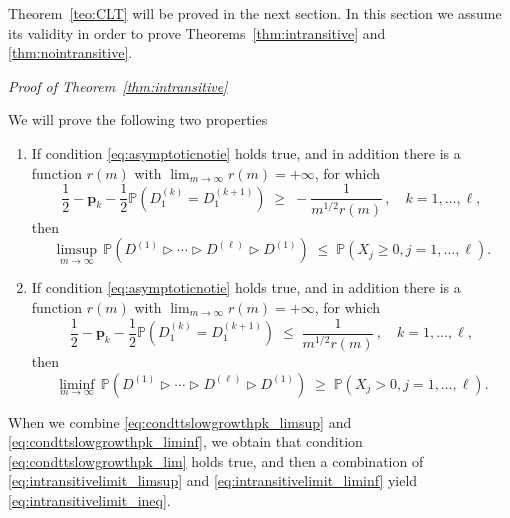 \documentclass[reqno,a4paper,11pt]{amsart}
\makeatletter
\newcommand{\btt}{\triangleright}
\theoremstyle{remark}
\newcommand{\mb}[1]{{\mathbf #1}}
\newcommand{\bb}[1]{{\mathbb #1}}
\numberwithin{equation}{section}
\renewenvironment{proof}[1][Proof]{\par
\pushQED{\qed}%
\normalfont \topsep6\p@\@plus6\p@\relax
\trivlist
\item\relax
{\itshape
#1\@addpunct{.}}\hspace\labelsep\ignorespaces
}{%
\popQED\endtrivlist\@endpefalse
}
\makeatother
\begin{document}
Theorem~\ref{teo:CLT} will be proved in the next section. In this section we assume its validity in order to prove Theorems~\ref{thm:intransitive} and \ref{thm:nointransitive}.

\begin{proof}[Proof of Theorem~\ref{thm:intransitive}]
We will prove the following two properties
%
\begin{enumerate}[(1)]
\item 
If condition \eqref{eq:asymptoticnotie} holds true, and in addition there is a function $r(m)$ with
$\lim_{m\to\infty}r(m)=+\infty$, for which
%
\begin{equation}\label{eq:condttslowgrowthpk_limsup}
\frac{1}{2}-\mb p_k-\frac{1}{2}\bb P(D_1^{(k)}=D_1^{(k+1)})
\;\geq\; -\frac{1}{m^{1/2}r(m)}\,,\quad k=1,\hdots, \ell,
\end{equation}
%
then
%
\begin{equation}\label{eq:intransitivelimit_limsup}
\limsup_{m\to \infty}\,\bb P\left({D^{(1)} \btt \cdots \btt D^{(\ell)} \btt D^{(1)}}\right)\;\leq\; \bb P\left(X_j\geq 0, j=1,\hdots, \ell \right).
\end{equation}

\item
If condition \eqref{eq:asymptoticnotie} holds true, and in addition there is a function $r(m)$ with
$\lim_{m\to\infty}r(m)=+\infty$, for which
%
\begin{equation}\label{eq:condttslowgrowthpk_liminf}
\frac{1}{2}-\mb p_k-\frac{1}{2}\bb P(D_1^{(k)}=D_1^{(k+1)})
\;\leq\; \frac{1}{m^{1/2}r(m)}\,,\quad k=1,\hdots, \ell,
\end{equation}
%
then
%
\begin{equation}\label{eq:intransitivelimit_liminf}
\liminf_{m\to \infty}\,\bb P({D^{(1)} \btt \cdots \btt D^{(\ell)} \btt D^{(1)}})
    \;\geq\; \bb P\left(X_j> 0, j=1,\hdots, \ell \right).
\end{equation}
\end{enumerate}

When we combine \eqref{eq:condttslowgrowthpk_limsup} and \eqref{eq:condttslowgrowthpk_liminf}, we obtain that condition \eqref{eq:condttslowgrowthpk_lim} holds true, and then a combination of \eqref{eq:intransitivelimit_limsup} and \eqref{eq:intransitivelimit_liminf} yield \eqref{eq:intransitivelimit_ineq}.


\end{proof}
\end{document}
